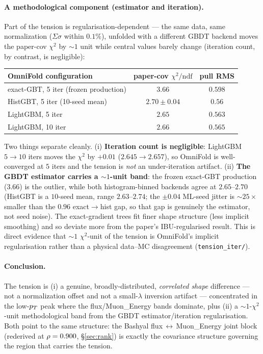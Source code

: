 \paragraph{A methodological component (estimator and iteration).}
Part of the tension is regularisation-dependent --- the same data, same
normalization ($\Sigma\sigma$ within $0.1\%$), unfolded with a different
GBDT backend moves the paper-cov $\chi^{2}$ by $\sim1$ unit while central
values barely change (iteration count, by contrast, is negligible):
\begin{center}
\begin{tabular}{@{}lcc@{}}
\toprule
OmniFold configuration & paper-cov $\chi^{2}/\mathrm{ndf}$ & pull RMS \\
\midrule
exact-GBT, 5 iter (frozen production) & $3.66$ & $0.598$ \\
HistGBT, 5 iter (10-seed mean) & $2.70\pm0.04$ & $0.56$ \\
LightGBM, 5 iter & $2.65$ & $0.563$ \\
LightGBM, 10 iter & $2.66$ & $0.565$ \\
\bottomrule
\end{tabular}
\end{center}
Two things separate cleanly. (i) \textbf{Iteration count is negligible}:
LightGBM $5\to10$ iters moves the $\chi^{2}$ by $+0.01$ ($2.645\to2.657$),
so OmniFold is well-converged at $5$ iters and the tension is \emph{not}
an under-iteration artifact. (ii) \textbf{The GBDT estimator carries a
$\sim1$-unit band}: the frozen exact-GBT production ($3.66$) is the
outlier, while both histogram-binned backends agree at $2.65$--$2.70$
(HistGBT is a $10$-seed mean, range $2.63$--$2.74$; the $\pm0.04$ ML-seed
jitter is $\sim25\times$ smaller than the $0.96$ exact$\to$hist gap, so
that gap is genuinely the estimator, not seed noise). The exact-gradient
trees fit finer shape structure (less implicit smoothing) and so deviate
more from the paper's IBU-regularised result. This is direct evidence
that $\sim1$ $\chi^{2}$-unit of the tension is OmniFold's implicit
regularisation rather than a physical data--MC disagreement
(\texttt{tension\_iter/}).

\paragraph{Conclusion.}
The tension is (i) a genuine, broadly-distributed, \emph{correlated shape}
difference --- not a normalization offset and not a small-$\lambda$
inversion artifact --- concentrated in the low-$p_{T}$ peak where the
flux/Muon\_Energy bands dominate, plus (ii) a $\sim1$-$\chi^{2}$-unit
methodological band from the GBDT estimator/iteration regularisation.
Both point to the same structure: the Bashyal
flux\,$\leftrightarrow$\,Muon\_Energy joint block (rederived at
$\rho=0.900$, \S\ref{sec:rank}) is exactly the covariance structure
governing the region that carries the tension.

